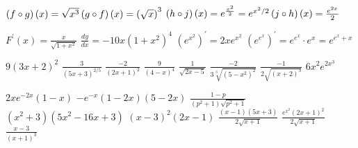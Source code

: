 \begin{Answer}[ref={exPQCRules}]
\Question $\left (f \circ g\right ) \left (x\right ) =\sqrt{x^{3}}\\
\left (g \circ f\right ) \left (x\right ) =\left (\sqrt{x}\right )^{3}$
\Question $\left (h \circ j\right ) \left (x\right ) =e^{\frac{x^{2}}{2}} =e^{x^{2}/2}\\
\left (j \circ h\right ) \left (x\right ) =\frac{e^{2 x}}{2}$
\Question %
\begin{tasks}
	\task $F^{ \prime } (x) =\frac{x}{\sqrt{1 +x^{2}}}$ 
	\task $\frac{d y}{d x} = -10 x \left (1 +x^{2}\right )^{4}$ 	
	\task $\left (e^{x^{2}}\right )^{ \prime } =2 x e^{x^{2}}$ 
	\task $\left (e^{e^{x}}\right )^{ \prime } =e^{e^{x}} \cdot e^{x} =e^{e^{x} +x}$
\end{tasks}

\Question %
\begin{tasks}
	\task $9 \left (3 x +2\right )^{2}$
	\task $\frac{3}{\left (5 x +3\right )^{2/5}}$
	\task $\frac{ -2}{\left (2 x +1\right )^{2}}$ 
	\task $\frac{9}{\left (4 -x\right )^{4}}$ 	
	\task $\frac{1}{\sqrt{2 x -5}}$ 
	\task $\frac{ -2}{3 \sqrt[{3}]{\left (5 -x^{2}\right )^{2}}}$ 
	\task $\frac{ -1}{2 \sqrt{\left (x +2\right )^{3}}}$ 
	\task $6 x^{2} e^{2 x^{3}}$ 
\end{tasks}

\Question %
\begin{tasks}
	\task $2 x e^{ -2 x} \left (1 -x\right )$
	\task $ -e^{ -x} (1 -2 x) \left (5 -2 x\right )$ 
	\task $\frac{1 -p}{\left (p^{2} +1\right ) \sqrt{p^{2} +1}}$
	\task $\left (x^{2} +3\right ) \left (5 x^{2} -16 x +3\right )$ 
	\task $\left (x -3\right )^{2} \left (2 x -1\right )$ 
	\task $\frac{\left (x -1\right ) \left (5 x +3\right )}{2 \sqrt{x +1}}$ 
	\task $\frac{e^{x^{2}} \left (2 x +1\right )^{2}}{2 \sqrt{x +1}}$ 
	\task $\frac{x -3}{\left (x +1\right )^{3}}$
\end{tasks}	
\end{Answer}%

